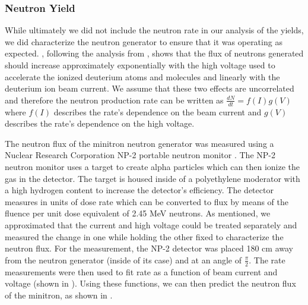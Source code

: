 \subsubsection{Neutron Yield}

While ultimately we did not include the neutron rate in our analysis of the yields, we did characterize the neutron generator to ensure that it was operating as expected.  , following the analysis from , shows that the flux of neutrons generated should increase approximately exponentially with the high voltage used to accelerate the ionized deuterium atoms and molecules and linearly with the deuterium ion beam current.  We assume that these two effects are uncorrelated and therefore the neutron production rate can be written as $\frac{dN}{dt} = f(I)g(V)$ where $f(I)$ describes the rate's dependence on the beam current and $g(V)$ describes the rate's dependence on the high voltage.

The neutron flux of the minitron neutron generator was measured using a Nuclear Research Corporation NP-2 portable neutron monitor \cite{np2_manual}.  The NP-2 neutron monitor uses a  target to create alpha particles which can then ionize the gas in the detector.  The target is housed inside of a polyethylene moderator with a high hydrogen content to increase the detector's efficiency.  The detector measures in units of dose rate which can be converted to flux by means of the fluence per unit dose equivalent of 2.45 MeV neutrons.  As mentioned, we approximated that the current and high voltage could be treated separately and measured the change in one while holding the other fixed to characterize the neutron flux.  For the measurement, the NP-2 detector was placed 180 cm away from the neutron generator (inside of its case) and at an angle of $\frac{\pi}{2}$.  The rate measurements were then used to fit rate as a function of beam current and voltage (shown in ).  Using these functions, we can then predict the neutron flux of the minitron, as shown in .


